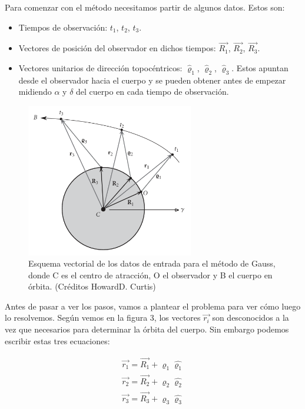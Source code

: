 \documentclass{article}
\numberwithin{equation}{section}
\begin{document}
Para comenzar con el método necesitamos partir de algunos datos. Estos son:

\begin{itemize}
    \item Tiempos de observación: $t_1$, $t_2$, $t_3$.
    \item Vectores de posición del observador en dichos tiempos: $\overrightarrow{R_1}$, $\overrightarrow{R_2}$, $\overrightarrow{R_3}$.
            \item Vectores unitarios de dirección topocéntricos: $\hat{\mathbf{\varrho}}_1$, $\hat{\mathbf{\varrho}}_2$, $\hat{\mathbf{\varrho}}_3$. Estos apuntan desde el observador hacia el cuerpo y se pueden obtener antes de empezar midiendo $\alpha$ y $\delta$ del cuerpo en cada tiempo de observación.
\end{itemize}

\begin{figure}[h]
    \centering
    \includegraphics[width=0.65\textwidth]{entra.png}
    \caption{Esquema vectorial de los datos de entrada para el método de Gauss, donde C es el centro de atracción, O el observador y B el cuerpo en órbita. (Créditos 
    HowardD. Curtis)}
\end{figure} 
\newpage
Antes de pasar a ver los pasos, vamos a plantear el problema para ver cómo luego lo resolvemos. Según vemos en la figura 3, los vectores $\overrightarrow{r_i}$ son desconocidos a la vez que necesarios para determinar la órbita del cuerpo. Sin embargo podemos escribir estas tres ecuaciones:\par

\begin{align}
    \overrightarrow{r_1} = \overrightarrow{R_1} + \varrho_1 \hat{\varrho_1} \\
    \overrightarrow{r_2} = \overrightarrow{R_2} + \varrho_2 \hat{\varrho_2} \\
    \overrightarrow{r_3} = \overrightarrow{R_3} + \varrho_3 \hat{\varrho_3}
\end{align}
\end{document}
